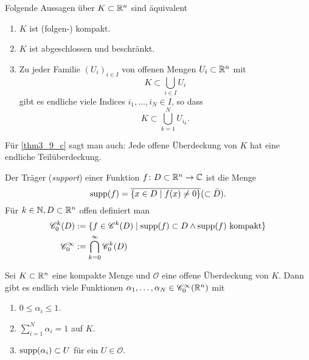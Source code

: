 \begin{thm}\label{thm3_9}
	Folgende Aussagen über $K \subset \mathbb{R}^n$ sind äquivalent
	\begin{enumerate}[label=(\alph*)]
		\item $K$ ist (folgen-) kompakt.
		\item $K$ ist abgeschlossen und beschränkt.
		\item\label{thm3_9_c} Zu jeder Familie $(U_i)_{i\in I}$ von offenen Mengen $U_i \subset \mathbb{R}^n$ mit
		\[K \subset \bigcup_{i \in I} U_i\]
		gibt es endliche viele Indices $i_1, \dots, i_N \in I$, so dass
		\[K \subset \bigcup_{k = 1}^N U_{i_k}.\]
	\end{enumerate}
	Für \ref{thm3_9_c} sagt man auch: Jede offene Überdeckung von $K$ hat eine endliche Teilüberdeckung.
\end{thm}
Der Träger (\textit{support}) einer Funktion $f \colon D \subset \mathbb{R}^n \to \mathbb{C}$ ist die Menge
\[\mathrm{supp}(f) = \overline{\{x \in D \mid f(x) \neq 0\}} (\subset \bar{D}).\]
Für $k \in \mathbb{N}, D \subset \mathbb{R}^n$ offen definiert man
\begin{align*}
	\mathscr{C}_0^k (D) &:= \{f \in \mathscr{C}^k (D) \mid \mathrm{supp}(f) \subset D \land \mathrm{supp}(f) \text{ kompakt}\}\\
	\mathscr{C}_0^\infty &:= \bigcap_{k=0}^\infty \mathscr{C}_0^k (D)
\end{align*}
\begin{thm}\label{thm3_10}
	Sei $K \subset \mathbb{R}^n$ eine kompakte Menge und $\mathscr{O}$ eine offene Überdeckung von $K$. Dann gibt es endlich viele Funktionen $\alpha_1, \dots, \alpha_N \in \mathscr{C}_0^\infty (\mathbb{R}^n)$ mit
	\begin{enumerate}[label=(\alph*)]
		\item $0 \leq \alpha_i \leq 1$.
		\item $\displaystyle \sum_{i=1}^N \alpha_i = 1$ auf $K$.
		\item $\mathrm{supp}(\alpha_i) \subset U$ für ein $U \in \mathscr{O}$.
	\end{enumerate}
\end{thm}

